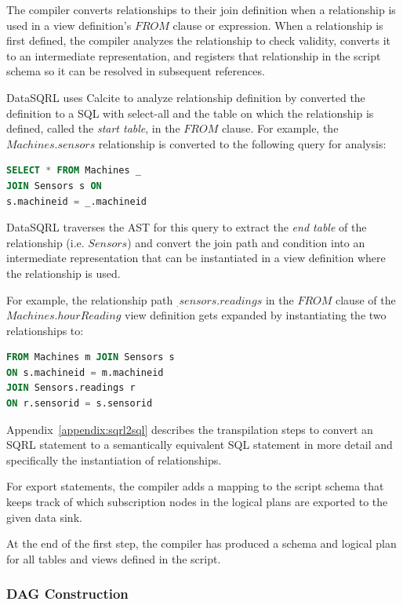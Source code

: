 \documentclass[	DIV=calc,%
							paper=letter,%
							fontsize=11pt,%
							twocolumn]{scrartcl}	 					%
\begin{document}
The compiler converts relationships to their join definition when a relationship is used in a view definition's $FROM$ clause or expression.
When a relationship is first defined, the compiler analyzes the relationship to check validity, converts it to an intermediate representation, and registers that relationship in the script schema so it can be resolved in subsequent references.

DataSQRL uses Calcite to analyze relationship definition by converted the definition to a SQL with select-all and the table on which the relationship is defined, called the \emph{start table}, in the $FROM$ clause. For example, the $Machines.sensors$ relationship is converted to the following query for analysis:
\begin{lstlisting}[language=SQL]
SELECT * FROM Machines _
JOIN Sensors s ON
s.machineid = _.machineid
\end{lstlisting}
DataSQRL traverses the AST for this query to extract the \emph{end table} of the relationship (i.e. $Sensors$) and convert the join path and condition into an intermediate representation that can be instantiated in a view definition where the relationship is used.

For example, the relationship path $_.sensors.readings$ in the $FROM$ clause of the $Machines.hourReading$ view definition gets expanded by instantiating the two relationships to:
\begin{lstlisting}[language=SQL]
FROM Machines m JOIN Sensors s
ON s.machineid = m.machineid
JOIN Sensors.readings r
ON r.sensorid = s.sensorid
\end{lstlisting}

Appendix~\ref{appendix:sqrl2sql} describes the transpilation steps to convert an SQRL statement to a semantically equivalent SQL statement in more detail and specifically the instantiation of relationships.

For export statements, the compiler adds a mapping to the script schema that keeps track of which subscription nodes in the logical plans are exported to the given data sink.

At the end of the first step, the compiler has produced a schema and logical plan for all tables and views defined in the script.

\subsubsection{DAG Construction}
\end{document}
